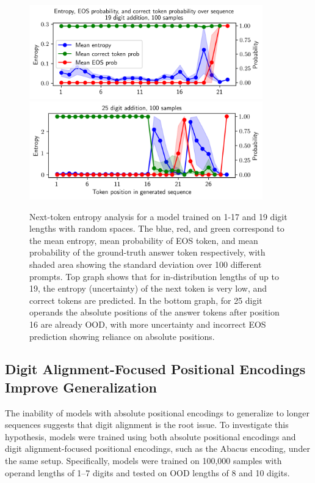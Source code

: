 \begin{figure}[h!]
    \centering
    \includegraphics[width=0.9\textwidth]{fig/next_token_entropy_19.png}
    \includegraphics[width=0.9\textwidth]{fig/next_token_entropy_25.png}
    \caption{Next-token entropy analysis for a model trained on 1-17 and 19 digit lengths with random spaces. The blue, red, and green correspond to the mean entropy, mean probability of EOS token, and mean probability of the ground-truth answer token respectively, with shaded area showing the standard deviation over 100 different prompts. Top graph shows that for in-distribution lengths of up to 19, the entropy (uncertainty) of the next token is very low, and correct tokens are predicted. In the bottom graph, for 25 digit operands the absolute positions of the answer tokens after position 16 are already OOD, with more uncertainty and incorrect EOS prediction showing reliance on absolute positions.}
    \label{fig:next_token_entropy}
\end{figure}

\subsection{Digit Alignment-Focused Positional Encodings Improve Generalization}\label{subsec:digit_alignment_pe}

The inability of models with absolute positional encodings to generalize to longer sequences suggests that digit alignment is the root issue. To investigate this hypothesis, models were trained using both absolute positional encodings and digit alignment-focused positional encodings, such as the Abacus encoding, under the same setup. Specifically, models were trained on 100,000 samples with operand lengths of 1--7 digits and tested on OOD lengths of 8 and 10 digits.

